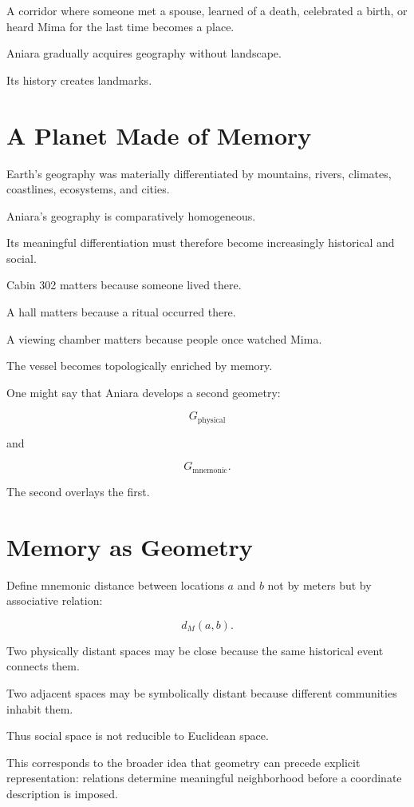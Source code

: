 \documentclass[11pt,oneside]{book}
\theoremstyle{definition}
\theoremstyle{remark}
\begin{document}
A corridor where someone met a spouse, learned of a death, celebrated a birth, or heard Mima for the last time becomes a place.

Aniara gradually acquires geography without landscape.

Its history creates landmarks.

\section{A Planet Made of Memory}

Earth's geography was materially differentiated by mountains, rivers, climates, coastlines, ecosystems, and cities.

Aniara's geography is comparatively homogeneous.

Its meaningful differentiation must therefore become increasingly historical and social.

Cabin 302 matters because someone lived there.

A hall matters because a ritual occurred there.

A viewing chamber matters because people once watched Mima.

The vessel becomes topologically enriched by memory.

One might say that Aniara develops a second geometry:

\[
G_{\mathrm{physical}}
\]

and

\[
G_{\mathrm{mnemonic}}.
\]

The second overlays the first.

\section{Memory as Geometry}

Define mnemonic distance between locations \(a\) and \(b\) not by meters but by associative relation:

\[
d_M(a,b).
\]

Two physically distant spaces may be close because the same historical event connects them.

Two adjacent spaces may be symbolically distant because different communities inhabit them.

Thus social space is not reducible to Euclidean space.

This corresponds to the broader idea that geometry can precede explicit representation: relations determine meaningful neighborhood before a coordinate description is imposed.
\end{document}

